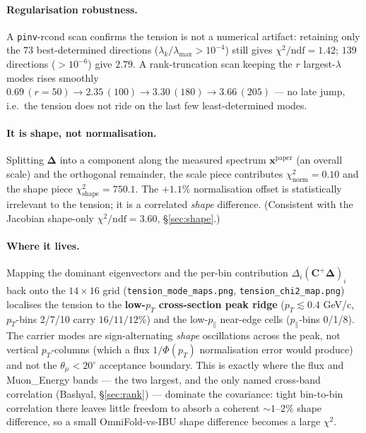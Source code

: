 \documentclass[12pt]{article}
\newcommand{\pT}{p_{T}}
\newcommand{\pPar}{p_{\parallel}}
\newcommand{\paper}{\text{paper}}
\begin{document}
\paragraph{Regularisation robustness.}
A \texttt{pinv}-rcond scan confirms the tension is not a numerical artifact:
retaining only the $73$ best-determined directions
($\lambda_{k}/\lambda_{\max}>10^{-4}$) still gives $\chi^{2}/\mathrm{ndf}=1.42$;
$139$ directions ($>10^{-6}$) give $2.79$. A rank-truncation scan keeping the
$r$ largest-$\lambda$ modes rises smoothly $0.69\,(r{=}50)\to2.35\,(100)\to
3.30\,(180)\to3.66\,(205)$ --- no late jump, i.e.\ the tension does not ride on
the last few least-determined modes.

\paragraph{It is shape, not normalisation.}
Splitting $\boldsymbol{\Delta}$ into a component along the measured
spectrum $\mathbf{x}^{\paper}$ (an overall scale) and the orthogonal
remainder, the scale piece contributes $\chi^{2}_{\mathrm{norm}}=0.10$ and the
shape piece $\chi^{2}_{\text{shape}}=750.1$. The $+1.1\%$ normalisation
offset is statistically irrelevant to the tension; it is a correlated
\emph{shape} difference. (Consistent with the Jacobian shape-only
$\chi^{2}/\mathrm{ndf}=3.60$, \S\ref{sec:shape}.)

\paragraph{Where it lives.}
Mapping the dominant eigenvectors and the per-bin contribution
$\Delta_{i}(\mathbf{C}^{+}\boldsymbol{\Delta})_{i}$ back onto the
$14\times16$ grid (\texttt{tension\_mode\_maps.png},
\texttt{tension\_chi2\_map.png}) localises the tension to the
\textbf{low-$\pT$ cross-section peak ridge} ($\pT\lesssim0.4$ GeV/c,
$\pT$-bins 2/7/10 carry $16/11/12\%$) and the low-$\pPar$ near-edge
cells ($\pPar$-bins 0/1/8). The carrier modes are sign-alternating
\emph{shape} oscillations across the peak, not vertical $\pT$-columns
(which a flux $1/\Phi(\pT)$ normalisation error would produce) and not
the $\theta_{\mu}<20^{\circ}$ acceptance boundary. This is exactly where
the flux and Muon\_Energy bands --- the two largest, and the only named
cross-band correlation (Bashyal, \S\ref{sec:rank}) --- dominate the
covariance: tight bin-to-bin correlation there leaves little freedom to
absorb a coherent $\sim1$--$2\%$ shape difference, so a small
OmniFold-vs-IBU shape difference becomes a large $\chi^{2}$.
\end{document}
